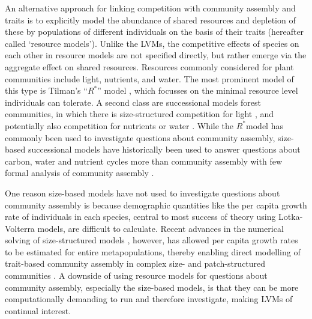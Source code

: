 \documentclass[a4paper,11pt]{article}
\newcommand{\Rstar}{\ensuremath{R^*}}
\begin{document}
An alternative approach for linking competition with community
assembly and traits is to explicitly model the abundance of shared
resources and depletion of these by populations of different
individuals on the basis of their traits (hereafter called `resource
models'). Unlike the LVMs, the competitive effects of species on each
other in resource models are not specified directly, but rather emerge
via the aggregate effect on shared resources. Resources commonly
considered for plant communities include light, nutrients, and
water. The most prominent model of this type is Tilman's ``\Rstar''
model \citep{Tilman-1977, Tilman-1982}, which focusses on the minimal
resource level individuals can tolerate. A second class are
successional models forest communities, in which there is
size-structured competition for light
\citep{Huston-1987,Kohyama-1993,Moorcroft-2001,Falster-2011,Falster-2016,Weng-2019},
and potentially also competition for nutrients or water
\citep{Moorcroft-2001,Farrior-2013, Smith-2014,
  Fisher-2018,Weng-2019}. While the \Rstar  model has commonly
  been used to investigate questions about community assembly,
  size-based successional models have historically been used to answer
  questions about carbon, water and nutrient cycles more than
  community assembly
  \citep{Moorcroft-2001,Medvigy-2012,Smith-2014,Fisher-2018} with few
  formal analysis of community assembly \citep{Kohyama-1993}. 

One reason size-based models have not used to investigate questions about community assembly is because demographic quantities like the per capita growth rate of individuals in each species, central to most success of theory using Lotka-Volterra models, are difficult to calculate. Recent advances in the numerical solving of size-structured models \citep{Falster-2016}, however, has allowed per capita growth rates to be estimated for entire metapopulations, thereby enabling direct modelling of trait-based community assembly in complex size- and patch-structured communities \cite{Falster-2017}. A downside of using resource models for questions about community assembly, especially the size-based models, is that they can be more computationally demanding to run and therefore investigate, making LVMs of continual interest.
\end{document}

